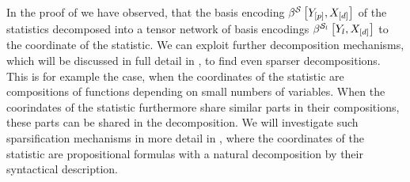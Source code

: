 In the proof of  we have observed, that the basis encoding $\beta^{\mathcal{S}}\left[Y_{[p]},X_{[d]}\right]$ of the statistics decomposed into a tensor network of basis encodings $\beta^{\mathcal{S}_{l}}\left[Y_{l},X_{[d]}\right]$ to the coordinate of the statistic.
We can exploit further decomposition mechanisms, which will be discussed in full detail in , to find even sparser decompositions.
This is for example the case, when the coordinates of the statistic are compositions of functions depending on small numbers of variables.
When the coorindates of the statistic furthermore share similar parts in their compositions, these parts can be shared in the decomposition.
We will investigate such sparsification mechanisms in more detail in , where the coordinates of the statistic are propositional formulas with a natural decomposition by their syntactical description.


